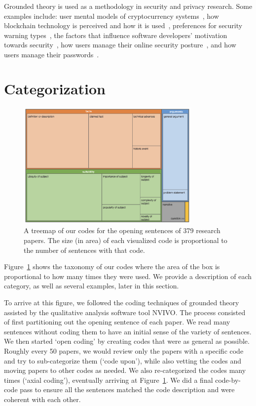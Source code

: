 \documentclass[sigconf]{acmart}
\begin{document}
Grounded theory is used as a methodology in security and privacy research. Some examples include: user mental models of cryptocurrency systems~\cite{mai2020user}, how blockchain technology is perceived and how it is used~\cite{ruoti2019blockchain}, preferences for security warning types~\cite{danilova2020one}, the factors that influence software developers' motivation towards security~\cite{assal2018motivations},  how users manage their online security posture~\cite{ruoti2017weighing}, and how users manage their passwords~\cite{stobert2014password}.

	\section{Categorization}

	\label{sec:categories}
	\begin{figure}[t]
		\centering
		\includegraphics[width=0.8\textwidth]{image.png}
		\caption{A treemap of our codes for the opening sentences of 379 research papers. The size (in area) of each visualized code is proportional to the number of sentences with that code.}
		\label{fig:treemap}
	\end{figure}

	Figure~\ref{fig:treemap} shows the taxonomy of our codes where the area of the box is proportional to how many times they were used. We provide a description of each category, as well as several examples, later in this section.

	To arrive at this figure, we followed the coding techniques of grounded theory assisted by the qualitative analysis software tool NVIVO. The process consisted of first partitioning out the opening sentence of each paper. We read many sentences without coding them to have an initial sense of the variety of sentences. We then started `open coding' by creating codes that were as general as possible. Roughly every 50 papers, we would review only the papers with a specific code and try to sub-categorize them (`code upon'), while also vetting the codes and moving papers to other codes as needed. We also re-categorized the codes many times (`axial coding'), eventually arriving at Figure~\ref{fig:treemap}. We did a final code-by-code pass to ensure all the sentences matched the code description and were coherent with each other.
\end{document}
